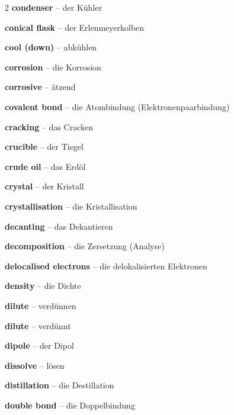 \begin{multicols}{2}
\textbf{condenser} -- der Kühler\dotfill\hyperref[e:58]{\pageref*{e:58}}\par
\textbf{conical flask} -- der Erlenmeyerkolben\dotfill\hyperref[e:41]{\pageref*{e:41}}\par
\textbf{cool (down)} -- abkühlen\dotfill\hyperref[e:71]{\pageref*{e:71}}\par
\textbf{corrosion} -- die Korrosion\dotfill\hyperref[e:190]{\pageref*{e:190}}\par
\textbf{corrosive} -- ätzend\dotfill\hyperref[e:172]{\pageref*{e:172}}\par
\textbf{covalent bond} -- die Atombindung (Elektronenpaarbindung)\dotfill\hyperref[e:109]{\pageref*{e:109}}\par
\textbf{cracking} -- das Cracken\dotfill\hyperref[e:234]{\pageref*{e:234}}\par
\textbf{crucible} -- der Tiegel\dotfill\hyperref[e:49]{\pageref*{e:49}}\par
\textbf{crude oil} -- das Erdöl\dotfill\hyperref[e:231]{\pageref*{e:231}}\par
\textbf{crystal} -- der Kristall\dotfill\hyperref[e:108]{\pageref*{e:108}}\par
\textbf{crystallisation} -- die Kristallisation\dotfill\hyperref[e:37]{\pageref*{e:37}}\par

\par\nopagebreak
\textbf{decanting} -- das Dekantieren\dotfill\hyperref[e:36]{\pageref*{e:36}}\par
\textbf{decomposition} -- die Zersetzung (Analyse)\dotfill\hyperref[e:134]{\pageref*{e:134}}\par
\textbf{delocalised electrons} -- die delokalisierten Elektronen\dotfill\hyperref[e:124]{\pageref*{e:124}}\par
\textbf{density} -- die Dichte\dotfill\hyperref[e:24]{\pageref*{e:24}}\par
\textbf{dilute} -- verdünnen\dotfill\hyperref[e:70]{\pageref*{e:70}}\par
\textbf{dilute} -- verdünnt\dotfill\hyperref[e:171]{\pageref*{e:171}}\par
\textbf{dipole} -- der Dipol\dotfill\hyperref[e:117]{\pageref*{e:117}}\par
\textbf{dissolve} -- lösen\dotfill\hyperref[e:67]{\pageref*{e:67}}\par
\textbf{distillation} -- die Destillation\dotfill\hyperref[e:35]{\pageref*{e:35}}\par
\textbf{double bond} -- die Doppelbindung\dotfill\hyperref[e:113]{\pageref*{e:113}}\par


\end{multicols}

